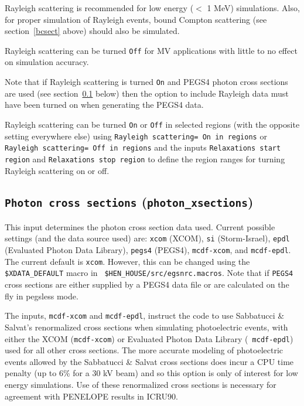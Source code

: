 \documentclass[12pt,twoside]{article}
\begin{document}
Rayleigh scattering is recommended for low energy ($<$ 1 MeV) simulations.
Also, for proper simulation of Rayleigh events, bound Compton scattering (see
section~\ref{bcsect} above) should also be simulated.

Rayleigh scattering can be turned {\tt Off} for MV applications with little to
no effect on simulation accuracy.

Note that if Rayleigh scattering is turned {\tt On} and PEGS4 photon cross
sections are used (see section~\ref{photxsectsect} below) then the option to
include Rayleigh data must have been turned on when generating the PEGS4 data.

Rayleigh scattering can be turned {\tt On} or {\tt Off} in selected regions
(with the opposite setting everywhere else) using
{\tt Rayleigh scattering= On in regions} or {\tt Rayleigh scattering= Off
in regions} and the inputs
{\tt Relaxations start region} and {\tt Relaxations stop region} to
define the region ranges for turning Rayleigh scattering on or off.

\subsection{{\tt Photon cross sections} ({\tt photon\_xsections})}
\label{photxsectsect}

This input determines the photon cross section data used. Current possible
settings (and the data source used) are: {\tt xcom} (XCOM), {\tt si}
(Storm-Israel), {\tt epdl} (Evaluated Photon Data Library), {\tt pegs4} (PEGS4),
{\tt mcdf-xcom}, and {\tt mcdf-epdl}.  The current default is {\tt xcom}.
However, this can be changed using the {\tt \$XDATA\_DEFAULT} macro in {\tt
\$HEN\_HOUSE/src/egsnrc.macros}. Note that if {\tt PEGS4} cross sections are
either supplied by a PEGS4 data file or are calculated on the fly in pegsless
mode.

 The
inputs, {\tt mcdf-xcom} and {\tt mcdf-epdl}, instruct the code to use Sabbatucci
\& Salvat's renormalized cross sections when simulating photoelectric events,
with either the XCOM ({\tt mcdf-xcom}) or Evaluated Photon Data Library ({\tt
mcdf-epdl}) used for all other cross sections.  The more accurate modeling of
photoelectric events allowed by the Sabbatucci \& Salvat cross sections does
incur a CPU time penalty (up to 6\% for a 30 kV beam) and so this option is only
of interest for low energy simulations. Use of these renormalized cross sections
is necessary for agreement with PENELOPE results in ICRU90\cite{ICRU90}.
\end{document}
